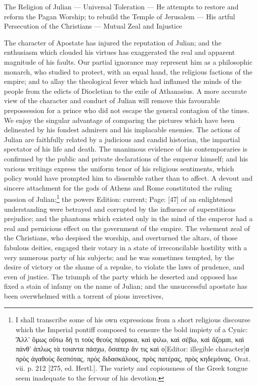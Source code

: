 
The Religion of Julian \texthebrew{—} Universal Toleration \texthebrew{—} He attempts to restore and reform the Pagan Worship; to rebuild the Temple of Jerusalem \texthebrew{—} His artful Persecution of the Christians \texthebrew{—} Mutual Zeal and Injustice

The character of Apostate has injured the reputation of Julian; and the enthusiasm which clouded his virtues has exaggerated the real and apparent magnitude of his faults. Our partial ignorance may represent him as a philosophic monarch, who studied to protect, with an equal hand, the religious factions of the empire; and to allay the theological fever which had inflamed the minds of the people from the edicts of Diocletian to the exile of Athanasius. A more accurate view of the character and conduct of Julian will remove this favourable prepossession for a prince who did not escape the general contagion of the times. We enjoy the singular advantage of comparing the pictures which have been delineated by his fondest admirers and his implacable enemies. The actions of Julian are faithfully related by a judicious and candid historian, the impartial spectator of his life and death. The unanimous evidence of his contemporaries is confirmed by the public and private declarations of the emperor himself; and his various writings express the uniform tenor of his religious sentiments, which policy would have prompted him to dissemble rather than to affect. A devout and sincere attachment for the gods of Athens and Rome constituted the ruling passion of Julian;\footnote{I shall transcribe some of his own expressions from a short religious discourse which the Imperial pontiff composed to censure the bold impiety of a Cynic: \textgreek{\texthebrew{Ἄ}λλ\texthebrew{’ ὅ}μως ο\texthebrew{ὕ}τω δή τι το\texthebrew{ὺ}ς θεο\texthebrew{ὺ}ς πέφρικα, κα\texthebrew{ὶ} φιλω, κα\texthebrew{ὶ} σέβω, κα\texthebrew{ὶ ἄ}ζομαι, κα\texthebrew{ὶ} πάνθ\texthebrew{’ ἁ}πλως τ\texthebrew{ὰ} τοιαντα πάσχω, \texthebrew{ὄ}σαπερ \texthebrew{ἄ}ν τις κα\texthebrew{ὶ} ο}[Editor: illegible character]\textgreek{α πρ\texthebrew{ὸ}ς \texthebrew{ἀ}γαθο\texthebrew{ὺ}ς δεσπότας, πρ\texthebrew{ὸ}ς διδασκάλους, πρ\texthebrew{ὸ}ς πατέρας, πρ\texthebrew{ὸ}ς κηδεμ\texthebrew{ὁ}νας}. Orat. vii. p. 212 [275, ed. Hertl.]. The variety and copiousness of the Greek tongue seem inadequate to the fervour of his devotion.} the powers Edition: current; Page: [47] of an enlightened understanding were betrayed and corrupted by the influence of superstitious prejudice; and the phantoms which existed only in the mind of the emperor had a real and pernicious effect on the government of the empire. The vehement zeal of the Christians, who despised the worship, and overturned the altars, of those fabulous deities, engaged their votary in a state of irreconcilable hostility with a very numerous party of his subjects; and he was sometimes tempted, by the desire of victory or the shame of a repulse, to violate the laws of prudence, and even of justice. The triumph of the party which he deserted and opposed has fixed a stain of infamy on the name of Julian; and the unsuccessful apostate has been overwhelmed with a torrent of pious invectives, 